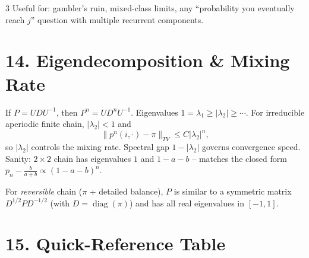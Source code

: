 \documentclass[8pt]{extarticle}
\newcommand{\diag}{\operatorname{diag}}
\begin{document}
\begin{multicols*}{3}
		Useful for: gambler's ruin, mixed-class limits, any ``probability you eventually reach $j$'' question with multiple recurrent components.
		
		\section*{14. Eigendecomposition \& Mixing Rate}
		
		If $P=UDU^{-1}$, then $P^n=UD^nU^{-1}$. Eigenvalues $1=\lambda_1\ge|\lambda_2|\ge\cdots$. For irreducible aperiodic finite chain, $|\lambda_2|<1$ and
		\[\|p^n(i,\cdot)-\pi\|_{TV}\le C|\lambda_2|^n,\]
		so $|\lambda_2|$ controls the mixing rate. Spectral gap $1-|\lambda_2|$ governs convergence speed. Sanity: $2\times 2$ chain has eigenvalues $1$ and $1-a-b$ -- matches the closed form $p_n-\tfrac{b}{a+b}\propto(1-a-b)^n$.
		
		For \emph{reversible} chain ($\pi$ + detailed balance), $P$ is similar to a symmetric matrix $D^{1/2}PD^{-1/2}$ (with $D=\diag(\pi)$) and has all real eigenvalues in $[-1,1]$.
		
		\columnbreak
		
		\section*{15. Quick-Reference Table}
		

\end{multicols*}
\end{document}
